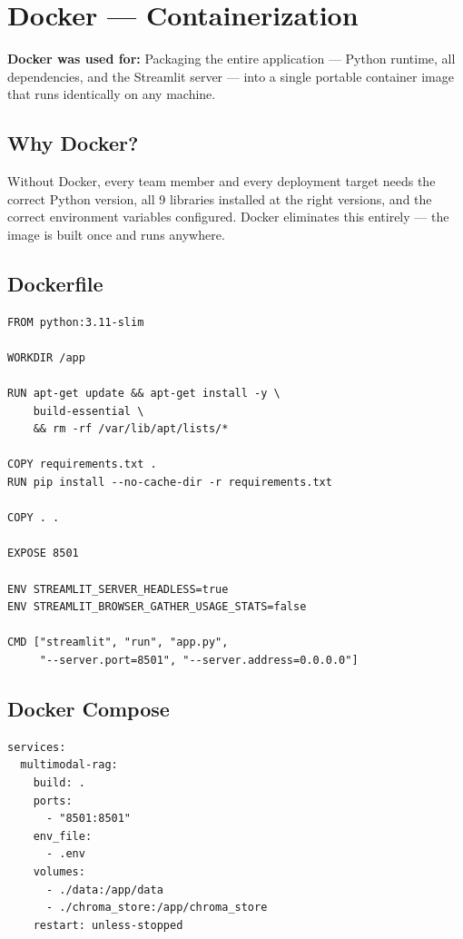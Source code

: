 \documentclass[12pt,a4paper]{report}
\begin{document}
\section{Docker --- Containerization}

\begin{mdframed}[style=toolbox]
\textbf{Docker was used for:} Packaging the entire application --- Python runtime, all dependencies, and the Streamlit server --- into a single portable container image that runs identically on any machine.
\end{mdframed}

\subsection{Why Docker?}

Without Docker, every team member and every deployment target needs the correct Python version, all 9 libraries installed at the right versions, and the correct environment variables configured. Docker eliminates this entirely --- the image is built once and runs anywhere.

\subsection{Dockerfile}

\begin{lstlisting}[caption=Dockerfile]
FROM python:3.11-slim

WORKDIR /app

RUN apt-get update && apt-get install -y \
    build-essential \
    && rm -rf /var/lib/apt/lists/*

COPY requirements.txt .
RUN pip install --no-cache-dir -r requirements.txt

COPY . .

EXPOSE 8501

ENV STREAMLIT_SERVER_HEADLESS=true
ENV STREAMLIT_BROWSER_GATHER_USAGE_STATS=false

CMD ["streamlit", "run", "app.py",
     "--server.port=8501", "--server.address=0.0.0.0"]
\end{lstlisting}

\subsection{Docker Compose}

\begin{lstlisting}[caption=docker-compose.yml]
services:
  multimodal-rag:
    build: .
    ports:
      - "8501:8501"
    env_file:
      - .env
    volumes:
      - ./data:/app/data
      - ./chroma_store:/app/chroma_store
    restart: unless-stopped
\end{lstlisting}
\end{document}
